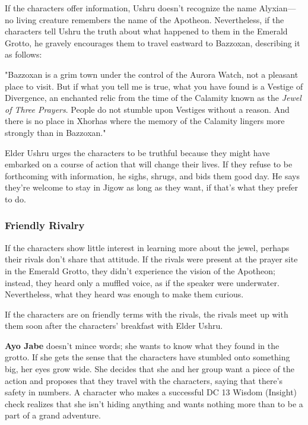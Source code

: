 \documentclass[letterpaper, 11pt, bg=full, twocolumn]{dndbook}
\begin{document}
If the characters offer information, Ushru doesn't recognize the name Alyxian---no living creature remembers the name of the Apotheon. Nevertheless, if the characters tell Ushru the truth about what happened to them in the Emerald Grotto, he gravely encourages them to travel eastward to Bazzoxan, describing it as follows:

\begin{DndReadAloud}
"Bazzoxan is a grim town under the control of the Aurora Watch, not a pleasant place to visit. But if what you tell me is true, what you have found is a Vestige of Divergence, an enchanted relic from the time of the Calamity known as the \textit{Jewel of Three Prayers}. People do not stumble upon Vestiges without a reason. And there is no place in Xhorhas where the memory of the Calamity lingers more strongly than in Bazzoxan."
\end{DndReadAloud}

Elder Ushru urges the characters to be truthful because they might have embarked on a course of action that will change their lives. If they refuse to be forthcoming with information, he sighs, shrugs, and bids them good day. He says they're welcome to stay in Jigow as long as they want, if that's what they prefer to do.

\subsubsection{Friendly Rivalry}

If the characters show little interest in learning more about the jewel, perhaps their rivals don't share that attitude. If the rivals were present at the prayer site in the Emerald Grotto, they didn't experience the vision of the Apotheon; instead, they heard only a muffled voice, as if the speaker were underwater. Nevertheless, what they heard was enough to make them curious.

If the characters are on friendly terms with the rivals, the rivals meet up with them soon after the characters' breakfast with Elder Ushru.

\textbf{Ayo Jabe} doesn't mince words; she wants to know what they found in the grotto. If she gets the sense that the characters have stumbled onto something big, her eyes grow wide. She decides that she and her group want a piece of the action and proposes that they travel with the characters, saying that there's safety in numbers. A character who makes a successful DC 13 Wisdom (Insight) check realizes that she isn't hiding anything and wants nothing more than to be a part of a grand adventure.
\end{document}
